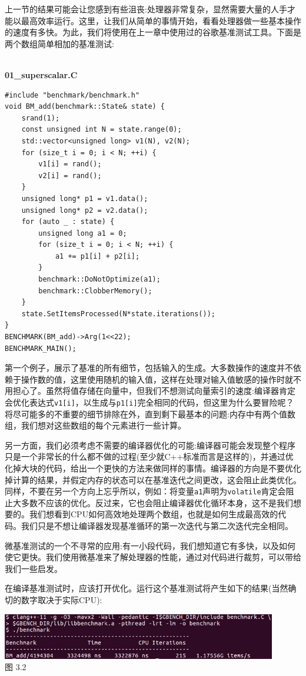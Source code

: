 
上一节的结果可能会让您感到有些沮丧:处理器非常复杂，显然需要大量的人手才能以最高效率运行。这里，让我们从简单的事情开始，看看处理器做一些基本操作的速度有多快。为此，我们将使用在上一章中使用过的谷歌基准测试工具。下面是两个数组简单相加的基准测试:

\hspace*{\fill} \\ %
\noindent
\textbf{01\_superscalar.C}
\begin{lstlisting}[style=styleCXX]
#include "benchmark/benchmark.h"
void BM_add(benchmark::State& state) {
	srand(1);
	const unsigned int N = state.range(0);
	std::vector<unsigned long> v1(N), v2(N);
	for (size_t i = 0; i < N; ++i) {
		v1[i] = rand();
		v2[i] = rand();
	}
	unsigned long* p1 = v1.data();
	unsigned long* p2 = v2.data();
	for (auto _ : state) {
		unsigned long a1 = 0;
		for (size_t i = 0; i < N; ++i) {
			a1 += p1[i] + p2[i];
		}
		benchmark::DoNotOptimize(a1);
		benchmark::ClobberMemory();
	}
	state.SetItemsProcessed(N*state.iterations());
}
BENCHMARK(BM_add)->Arg(1<<22);
BENCHMARK_MAIN();
\end{lstlisting}

第一个例子，展示了基准的所有细节，包括输入的生成。大多数操作的速度并不依赖于操作数的值，这里使用随机的输入值，这样在处理对输入值敏感的操作时就不用担心了。虽然将值存储在向量中，但我们不想测试向量索引的速度:编译器肯定会优化表达式\texttt{v1[i]}，以生成与\texttt{p1[i]}完全相同的代码，但这里为什么要冒险呢？将尽可能多的不重要的细节排除在外，直到剩下最基本的问题:内存中有两个值数组，我们想对这些数组的每个元素进行一些计算。

另一方面，我们必须考虑不需要的编译器优化的可能:编译器可能会发现整个程序只是一个非常长的什么都不做的过程(至少就C++标准而言是这样的)，并通过优化掉大块的代码，给出一个更快的方法来做同样的事情。编译器的方向是不要优化掉计算的结果，并假定内存的状态可以在基准迭代之间更改，这会阻止此类优化。同样，不要在另一个方向上忘乎所以，例如：将变量\texttt{a1}声明为\texttt{volatile}肯定会阻止大多数不应该的优化。反过来，它也会阻止编译器优化循环本身，这不是我们想要的。我们想看到CPU如何高效地处理两个数组，也就是如何生成最高效的代码。我们只是不想让编译器发现基准循环的第一次迭代与第二次迭代完全相同。

微基准测试的一个不寻常的应用:有一小段代码，我们想知道它有多快，以及如何使它更快。我们使用微基准来了解处理器的性能，通过对代码进行裁剪，可以带给我们一些启发。

在编译基准测试时，应该打开优化。运行这个基准测试将产生如下的结果(当然确切的数字取决于实际CPU):

\begin{center}
\includegraphics[width=0.9\textwidth]{content/1/chapter3/images/2.jpg}\\
图 3.2
\end{center}

